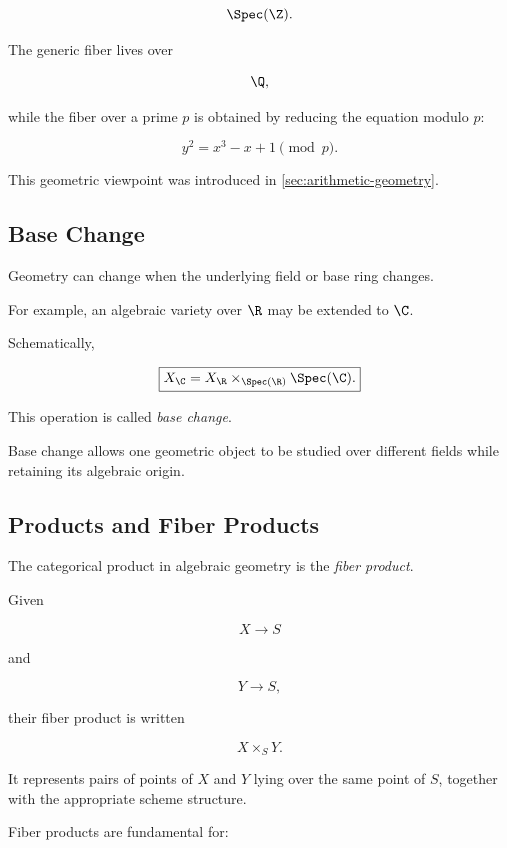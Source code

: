 \[
\Spec(\Z).
\]

The generic fiber lives over

\[
\Q,
\]

while the fiber over a prime \(p\) is obtained by reducing the equation
modulo \(p\):

\[
\boxed{
y^2=x^3-x+1
\pmod p.
}
\]

This geometric viewpoint was introduced in
\cref{sec:arithmetic-geometry}.

\subsection{Base Change}
\label{subsec:algebraic-base-change}

Geometry can change when the underlying field or base ring changes.

For example, an algebraic variety over \(\R\) may be extended to \(\C\).

Schematically,

\[
\boxed{
X_{\C}
=
X_{\R}\times_{\Spec(\R)}\Spec(\C).
}
\]

This operation is called \emph{base change}.

Base change allows one geometric object to be studied over different fields
while retaining its algebraic origin.

\subsection{Products and Fiber Products}
\label{subsec:algebraic-fiber-products}

The categorical product in algebraic geometry is the \emph{fiber product}.

Given

\[
X\to S
\]

and

\[
Y\to S,
\]

their fiber product is written

\[
\boxed{
X\times_S Y.
}
\]

It represents pairs of points of \(X\) and \(Y\) lying over the same point
of \(S\), together with the appropriate scheme structure.

Fiber products are fundamental for:


